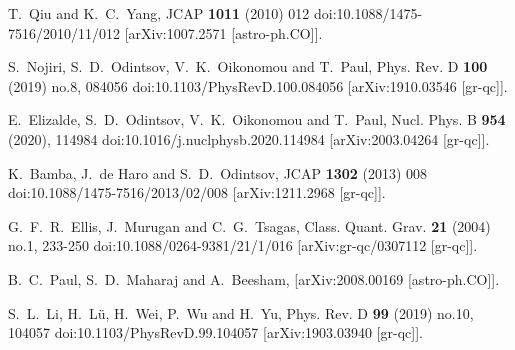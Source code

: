 \documentclass{article}
\begin{document}
\begin{thebibliography}{99}
T.~Qiu and K.~C.~Yang,
JCAP {\bf 1011} (2010) 012
doi:10.1088/1475-7516/2010/11/012
[arXiv:1007.2571 [astro-ph.CO]].




S.~Nojiri, S.~D.~Odintsov, V.~K.~Oikonomou and T.~Paul,
Phys. Rev. D \textbf{100} (2019) no.8, 084056
doi:10.1103/PhysRevD.100.084056
[arXiv:1910.03546 [gr-qc]].




E.~Elizalde, S.~D.~Odintsov, V.~K.~Oikonomou and T.~Paul,
Nucl. Phys. B \textbf{954} (2020), 114984
doi:10.1016/j.nuclphysb.2020.114984
[arXiv:2003.04264 [gr-qc]].







K.~Bamba, J.~de Haro and S.~D.~Odintsov,
JCAP {\bf 1302} (2013) 008
doi:10.1088/1475-7516/2013/02/008
[arXiv:1211.2968 [gr-qc]].


G.~F.~R.~Ellis, J.~Murugan and C.~G.~Tsagas,
Class. Quant. Grav. \textbf{21} (2004) no.1, 233-250
doi:10.1088/0264-9381/21/1/016
[arXiv:gr-qc/0307112 [gr-qc]].


B.~C.~Paul, S.~D.~Maharaj and A.~Beesham,
[arXiv:2008.00169 [astro-ph.CO]].


S.~L.~Li, H.~L\"u, H.~Wei, P.~Wu and H.~Yu,
Phys. Rev. D \textbf{99} (2019) no.10, 104057
doi:10.1103/PhysRevD.99.104057
[arXiv:1903.03940 [gr-qc]].








\end{thebibliography}
\end{document}
